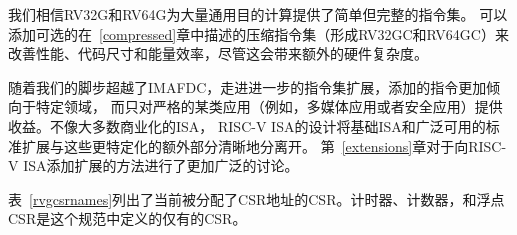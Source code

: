 我们相信RV32G和RV64G为大量通用目的计算提供了简单但完整的指令集。
可以添加可选的在~\ref{compressed}章中描述的压缩指令集（形成RV32GC和RV64GC）来改善性能、代码尺寸和能量效率，尽管这会带来额外的硬件复杂度。

随着我们的脚步超越了IMAFDC，走进进一步的指令集扩展，添加的指令更加倾向于特定领域，
而只对严格的某类应用（例如，多媒体应用或者安全应用）提供收益。不像大多数商业化的ISA，
RISC-V ISA的设计将基础ISA和广泛可用的标准扩展与这些更特定化的额外部分清晰地分离开。
第~\ref{extensions}章对于向RISC-V ISA添加扩展的方法进行了更加广泛的讨论。



\FloatBarrier
表~\ref{rvgcsrnames}列出了当前被分配了CSR地址的CSR。计时器、计数器，和浮点CSR是这个规范中定义的仅有的CSR。

